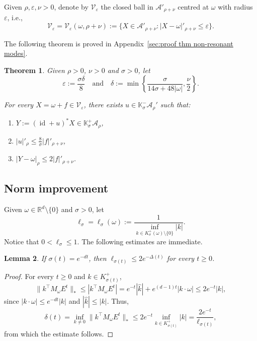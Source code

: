 \documentclass[12pt,reqno,a4paper]{amsart}%
\numberwithin{equation}{section}
\newtheorem{theorem}{Theorem}[section]
\newtheorem{lemma}[theorem]{Lemma}
\newcommand{\Vs}{{\mathscr{V}}}
\newcommand{\A}{{\mathcal A}}
\newcommand{\Kk}{{\mathbb{K}}}
\newcommand{\Rr}{{\mathbb{R}}}
\newcommand{\id}  {\operatorname{id}}
\begin{document}
Given $\rho,\varepsilon,\nu>0$, denote by $\Vs_\varepsilon$ the closed ball in $\A'_{\rho+\nu}$ centred at $\omega$ with radius $\varepsilon$, i.e.,
\begin{equation}\label{eq:Vepsilon}
\Vs_\varepsilon = \Vs_\varepsilon(\omega,\rho+\nu) := \{X\in \A'_{\rho+\nu}\colon |X-\omega|'_{\rho+\nu}\leq\varepsilon\}.
\end{equation}


The following theorem is proved in Appendix~\ref{sec:proof thm non-resonant modes}.


\begin{theorem}\label{thm unif}
Given $\rho>0$, $\nu>0$ and $\sigma>0$, let
$$
\varepsilon:=\frac{\sigma\delta}{8}\quad\text{and}\quad \delta:=\min\left\{\frac{\sigma}{14\sigma + 48|\omega|},\frac{\nu}2\right\}.
$$

For every $X=\omega+f\in \Vs_\varepsilon$, there exists $u\in \Kk_\sigma^-\A_{\rho}'$ such that:
\begin{enumerate}
\item $Y:=(\id+u)^*X \in \Kk_\sigma^+\A_{\rho}$,
\item $|u|'_{\rho}\leq\frac{8}{\sigma}|f|'_{\rho+\nu}$,
\item $|Y-\omega|_{\rho}\leq 2|f|'_{\rho+\nu}$.
\end{enumerate}
\end{theorem}



\subsection{Norm improvement}

Given $\omega\in\Rr^d\setminus\{0\}$ and $\sigma>0$, 
let
\begin{equation}\label{eq:ell}
\ell_{\sigma}=\ell_{\sigma}(\omega):=\frac{1}{\displaystyle\inf_{k\in K^+_\sigma(\omega)\setminus\{0\}}|k|}.
\end{equation}
Notice that $0<\ell_{\sigma}\leq1$.  The following estimates are immediate.

\begin{lemma}\label{lem:estimate ell} If $\sigma(t)=e^{-dt}$,  then 
$\ell_{\sigma(t)} \leq 2e^{-\Delta(t)}$ for every $t\geq0$.
\end{lemma}
\begin{proof}
For every $t\geq0$ and $k\in K^+_{\sigma(t)}$,  
$$
\|k^\top M_\omega E^t\|_* \leq |k^\top M_\omega E^t| = e^{-t}|\hat{k}|+ e^{(d-1)t}|k\cdot \omega| \leq 2e^{-t} |k|,
$$
since $|k\cdot \omega|\leq e^{-dt}|k|$ and $|\hat{k}|\leq |k|$.  Thus,
$$
\delta(t)=\inf_{k\neq0} \|k^\top M_\omega E^t\|_* \leq  2 e^{-t}\inf_{k\in K^+_{\sigma(t)}}|k| = \frac{2e^{-t}}{\ell_{\sigma(t)}},
$$
from which the estimate follows.
\end{proof}
\end{document}
